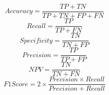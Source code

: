\documentclass[preview]{standalone}
\begin{document}
{\Large
\[
Accuracy=\frac{TP+TN}{TP+TN+FP+FN}
\]
}
{\Large
\[
Recall=\frac{TP}{TP+FN}
\]
}
{\Large
\[
Specificity=\frac{TN}{TN+FP}
\]
}
{\Large
\[
Precision=\frac{TP}{TP+FP}
\]
}
{\Large
\[
NPV=\frac{TN}{TN+FN}
\]
}
{\Large
\[
F1 Score=2\times\frac{Precision\times Recall}{Precision+Recall}
\]
}
\end{document}
